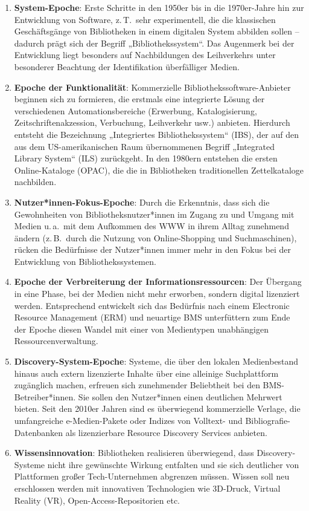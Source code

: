 \documentclass[
  11pt,
  letterpaper,
  DIV=11,
  twoside]{scrreprt}
\begin{document}
\begin{enumerate}
\def\labelenumi{\arabic{enumi}.}
\item
  \textbf{System-Epoche}: Erste Schritte in den 1950er bis in die
  1970er-Jahre hin zur Entwicklung von Software, z.\,T.~sehr
  experimentell, die die klassischen Geschäftsgänge von Bibliotheken in
  einem digitalen System abbilden sollen -- dadurch prägt sich der
  Begriff „Bibliothekssystem``. Das Augenmerk bei der Entwicklung liegt
  besonders auf Nachbildungen des Leihverkehrs unter besonderer
  Beachtung der Identifikation überfälliger Medien.
\item
  \textbf{Epoche der Funktionalität}: Kommerzielle
  Bibliothekssoftware-Anbieter beginnen sich zu formieren, die erstmals
  eine integrierte Lösung der verschiedenen Automationsbereiche
  (Erwerbung, Katalogisierung, Zeitschriftenakzession, Verbuchung,
  Leihverkehr usw.) anbieten. Hierdurch entsteht die Bezeichnung
  „Integriertes Bibliothekssystem`` (IBS), der auf den aus dem
  US-amerikanischen Raum übernommenen Begriff „Integrated Library
  System`` (ILS) zurückgeht. In den 1980ern entstehen die ersten
  Online-Kataloge (OPAC), die die in Bibliotheken traditionellen
  Zettelkataloge nachbilden.
\item
  \textbf{Nutzer*innen-Fokus-Epoche}: Durch die Erkenntnis, dass sich
  die Gewohnheiten von Bibliotheksnutzer*innen im Zugang zu und Umgang
  mit Medien u.\,a.~mit dem Aufkommen des WWW in ihrem Alltag zunehmend
  ändern (z.\,B.~durch die Nutzung von Online-Shopping und
  Suchmaschinen), rücken die Bedürfnisse der Nutzer*innen immer mehr in
  den Fokus bei der Entwicklung von Bibliothekssystemen.
\item
  \textbf{Epoche der Verbreiterung der Informationsressourcen}: Der
  Übergang in eine Phase, bei der Medien nicht mehr erworben, sondern
  digital lizenziert werden. Entsprechend entwickelt sich das Bedürfnis
  nach einem Electronic Resource Management ({ERM}) und neuartige BMS
  unterfüttern zum Ende der Epoche diesen Wandel mit einer von
  Medientypen unabhängigen Ressourcenverwaltung.
\item
  \textbf{Discovery-System-Epoche}: Systeme, die über den lokalen
  Medienbestand hinaus auch extern lizenzierte Inhalte über eine
  alleinige Suchplattform zugänglich machen, erfreuen sich zunehmender
  Beliebtheit bei den BMS-Betreiber*innen. Sie sollen den Nutzer*innen
  einen deutlichen Mehrwert bieten. Seit den 2010er Jahren sind es
  überwiegend kommerzielle Verlage, die umfangreiche e-Medien-Pakete
  oder Indizes von Volltext- und Bibliografie-Datenbanken als
  lizenzierbare Resource Discovery Services anbieten.
\item
  \textbf{Wissensinnovation}: Bibliotheken realisieren überwiegend, dass
  Discovery-Systeme nicht ihre gewünschte Wirkung entfalten und sie sich
  deutlicher von Plattformen großer Tech-Unternehmen abgrenzen müssen.
  Wissen soll neu erschlossen werden mit innovativen Technologien wie
  3D-Druck, Virtual Reality (VR), Open-Access-Repositorien etc.
\end{enumerate}
\end{document}
